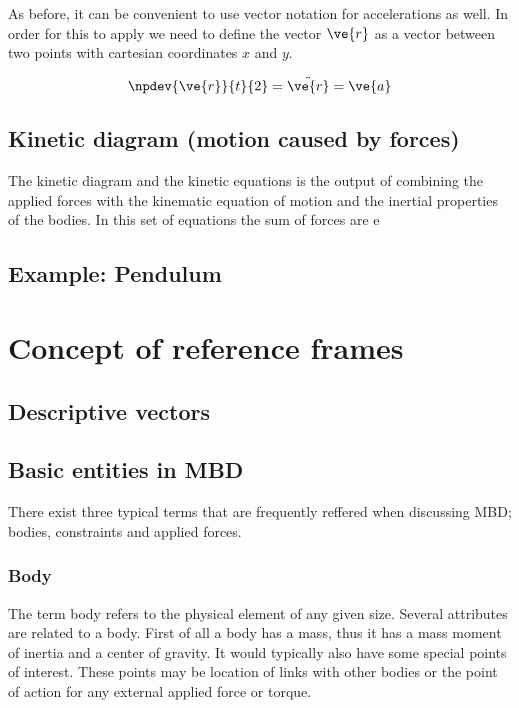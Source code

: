 \par As before, it can be convenient to use vector notation for accelerations as well. In order for this to apply
	we need to define the vector $\ve{r}$ as a vector between two points with cartesian coordinates $x$ and $y$.

\begin{equation}
 	 \npdev{\ve{r}}{t}{2} = \ddot{\ve{r}} = \ve{a}
\end{equation}


\subsection{Kinetic diagram (motion caused by forces)}
\par The kinetic diagram and the kinetic equations is the output of combining the applied forces with the kinematic
	equation of motion and the inertial properties of the bodies. In this set of equations the sum of forces are e

\subsection{Example: Pendulum}

\section{Concept of reference frames}
\subsection{Descriptive vectors}

\subsection{Basic entities in MBD}
\par There exist three typical terms that are frequently reffered when discussing MBD; bodies, constraints and applied
	forces.

\subsubsection{Body}
\par The term body refers to the physical element of any given size. Several attributes are related to a body. 
	First of all a body has a mass, thus it has a mass moment of inertia and a center of gravity. It would
	typically also have some special points of interest. These points may be location of links with other bodies
	or the point of action for any external applied force or torque.
